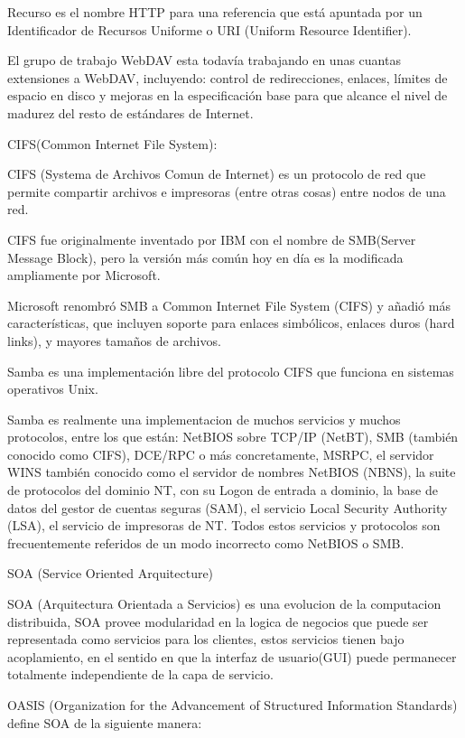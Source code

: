 Recurso es el nombre HTTP para una referencia que está apuntada por un Identificador de Recursos Uniforme o URI (Uniform Resource Identifier).

El grupo de trabajo WebDAV esta todavía trabajando en unas cuantas extensiones a WebDAV, incluyendo: control de redirecciones, enlaces, límites de espacio en disco y mejoras en la especificación base para que alcance el nivel de madurez del resto de estándares de Internet.

CIFS(Common Internet File System):

CIFS (Systema de Archivos Comun de Internet) es un protocolo de red que permite compartir archivos e impresoras (entre otras cosas) entre nodos de una red.

CIFS fue originalmente inventado por IBM con el nombre de SMB(Server Message Block), pero la versión más común hoy en día es la modificada ampliamente por Microsoft.

Microsoft renombró SMB a Common Internet File System (CIFS) y añadió más características, que incluyen soporte para enlaces simbólicos, enlaces duros (hard links), y mayores tamaños de archivos.

Samba es una implementación libre del protocolo CIFS que funciona en sistemas operativos Unix.

Samba es realmente una implementacion de muchos servicios y muchos protocolos, entre los que están: NetBIOS sobre TCP/IP (NetBT), SMB (también conocido como CIFS), DCE/RPC o más concretamente, MSRPC, el servidor WINS también conocido como el servidor de nombres NetBIOS (NBNS), la suite de protocolos del dominio NT, con su Logon de entrada a dominio, la base de datos del gestor de cuentas seguras (SAM), el servicio Local Security Authority (LSA), el servicio de impresoras de NT. Todos estos servicios y protocolos son frecuentemente referidos de un modo incorrecto como NetBIOS o SMB.

SOA (Service Oriented Arquitecture)

SOA (Arquitectura Orientada a Servicios) es una evolucion de la computacion distribuida, SOA provee modularidad en la logica de negocios que puede ser representada como servicios para los clientes, estos servicios tienen bajo acoplamiento, en el sentido en que la interfaz de usuario(GUI) puede permanecer totalmente independiente de la capa de servicio.

OASIS (Organization for the Advancement of Structured Information Standards) define SOA de la siguiente manera:

